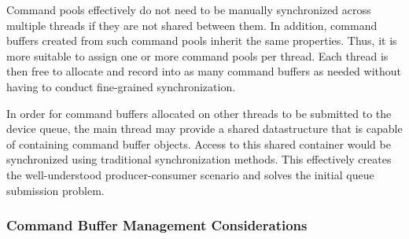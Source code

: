       Command pools effectively do not need to be manually synchronized across multiple threads if they are not shared between them.
      In addition, command buffers created from such command pools inherit the same properties.
      Thus, it is more suitable to assign one or more command pools per thread.
      Each thread is then free to allocate and record into as many command buffers as needed without having to conduct fine-grained synchronization.

      In order for command buffers allocated on other threads to be submitted to the device queue, the main thread may provide a shared datastructure that is capable of containing command buffer objects.
      Access to this shared container would be synchronized using traditional synchronization methods.
      This effectively creates the well-understood producer-consumer scenario\cite{EWD:EWD329} and solves the initial queue submission problem.


      \subsubsection{Command Buffer Management Considerations}


